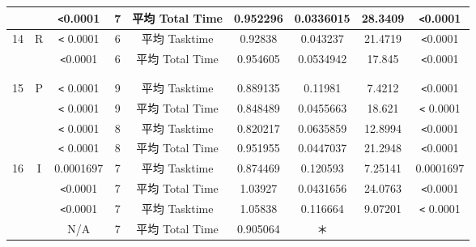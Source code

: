 \begin{table}[ht]
\begin{center}
\begin{tabular}{|c|c|c|c|c|c|c|c|c|}
 &  & \verb|<|0.0001 & 7 & 平均 Total Time & 0.952296 & 0.0336015 & 28.3409 & \verb|<|0.0001 \\\hline
14 & R & \verb|<| 0.0001 & 6 & 平均 Tasktime & 0.92838 & 0.043237 & 21.4719 &\verb|<|0.0001 \\\hline
 &  & \verb|<|0.0001 & 6 & 平均 Total Time & 0.954605 & 0.0534942 & 17.845 & \verb|<|0.0001 \\\hline
 &  &  &  &  &  &  &  & \\\hline
 &  &  &  &  &  &  &  &  \\\hline
15 & P & \verb|<| 0.0001 & 9 & 平均 Tasktime & 0.889135 & 0.11981 & 7.4212 & \verb|<|0.0001\\\hline
 &  & \verb|<| 0.0001 & 9 & 平均 Total Time & 0.848489 & 0.0455663 & 18.621 & \verb|<| 0.0001\\\hline
 &  &\verb|<| 0.0001 & 8 & 平均 Tasktime & 0.820217 & 0.0635859 & 12.8994 & \verb|<|0.0001\\\hline
 &  & \verb|<| 0.0001 & 8 & 平均 Total Time & 0.951955 & 0.0447037 & 21.2948 & \verb|<|0.0001\\\hline
16 & I & 0.0001697 & 7 & 平均 Tasktime & 0.874469 & 0.120593 & 7.25141 & 0.0001697 \\\hline
 &  &\verb|<|0.0001 & 7 & 平均 Total Time & 1.03927 & 0.0431656 & 24.0763 & \verb|<|0.0001\\\hline
 &  & \verb|<|0.0001 & 7 & 平均 Tasktime & 1.05838 & 0.116664 & 9.07201 & \verb|<| 0.0001\\\hline
 &  & N/A & 7 & 平均 Total Time & 0.905064 & ＊ &  &  \\\hline
\end{tabular}
  \label{tb:test5}
\end{center}
\end{table}

